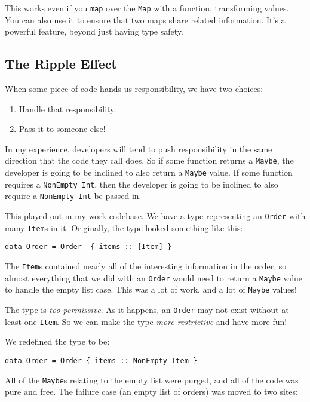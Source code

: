 This works even if you \texttt{map} over the \texttt{Map} with a function, transforming values. You can also use it to ensure that two maps share related information. It's a powerful feature, beyond just having type safety.






\subsection{The Ripple Effect}

When some piece of code hands us responsibility, we have two choices:

\begin{enumerate}
\item Handle that responsibility.
\item Pass it to someone else!
\end{enumerate}
In my experience, developers will tend to push responsibility in the same direction that the code they call does. So if some function returns a \texttt{Maybe}, the developer is going to be inclined to also return a \texttt{Maybe} value. If some function requires a \texttt{NonEmpty Int}, then the developer is going to be inclined to also require a \texttt{NonEmpty Int} be passed in.

This played out in my work codebase. We have a type representing an \texttt{Order} with many \texttt{Item}s in it. Originally, the type looked something like this:

\begin{verbatim}
data Order = Order  { items :: [Item] }
\end{verbatim}
The \texttt{Item}s contained nearly all of the interesting information in the order, so almost everything that we did with an \texttt{Order} would need to return a \texttt{Maybe} value to handle the empty list case. This was a lot of work, and a lot of \texttt{Maybe} values!

The type is \textit{too permissive}. As it happens, an \texttt{Order} may not exist without at least one \texttt{Item}. So we can make the type \textit{more restrictive} and have more fun!

We redefined the type to be:

\begin{verbatim}
data Order = Order { items :: NonEmpty Item }
\end{verbatim}
All of the \texttt{Maybe}s relating to the empty list were purged, and all of the code was pure and free. The failure case (an empty list of orders) was moved to two sites:


